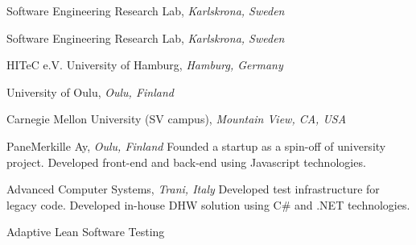 \documentclass[9pt]{article}
\begin{document}
\noindent Software Engineering Research Lab, \emph{Karlskrona, Sweden} \vspace{0.01in} 
\newline{}
\bigskip

\noindent Software Engineering Research Lab, \emph{Karlskrona, Sweden} \vspace{0.01in} 
\newline{}
\bigskip

\noindent HITeC e.V. \amper{} University of Hamburg, \emph{Hamburg, Germany} \vspace{0.01in} 
\newline{}
\bigskip

\noindent University of Oulu, \emph{Oulu, Finland} \vspace{0.01in} 
\newline{}
\bigskip

\noindent Carnegie Mellon University (SV campus), \emph{Mountain View, CA, USA} \vspace{0.01in}  
\newline{}
\bigskip

\noindent PaneMerkille Ay, \emph{Oulu, Finland} \vspace{0.01in} 
\newline{}
\newline\noindent Founded a startup as a spin-off of university project.
\newline\noindent Developed front-end and back-end using Javascript technologies.
\bigskip

\noindent Advanced Computer Systems, \emph{Trani, Italy} \vspace{0.01in} 
\newline{}
\newline\noindent Developed test infrastructure for legacy code.
\newline\noindent Developed in-house DHW solution using C\# and .NET technologies.
\bigskip

  
\newline\noindent Adaptive Lean Software Testing 
\bigskip
\end{document}
